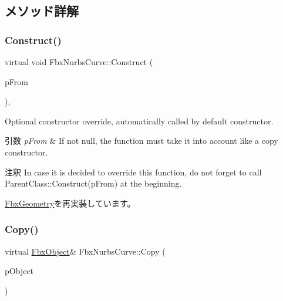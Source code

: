 \subsection{メソッド詳解}
\mbox{\label{class_fbx_nurbs_curve_ac730e9ec1d56724f8495725b0491ddd8}} 
\subsubsection{\texorpdfstring{Construct()}{Construct()}}
{\footnotesize\ttfamily virtual void Fbx\+Nurbs\+Curve\+::\+Construct (\begin{DoxyParamCaption}\item[{const \hyperlink{class_fbx_object}{Fbx\+Object} $\ast$}]{p\+From }\end{DoxyParamCaption})\hspace{0.3cm}{\ttfamily [protected]}, {\ttfamily [virtual]}}

Optional constructor override, automatically called by default constructor. 
\begin{DoxyParams}{引数}
{\em p\+From} & If not null, the function must take it into account like a copy constructor. \\
\hline
\end{DoxyParams}
\begin{DoxyRemark}{注釈}
In case it is decided to override this function, do not forget to call Parent\+Class\+::\+Construct(p\+From) at the beginning. 
\end{DoxyRemark}


\hyperlink{class_fbx_geometry_a26ca96a86f17783c45ff83b33d2b5324}{Fbx\+Geometry}を再実装しています。

\mbox{\label{class_fbx_nurbs_curve_ad48046242c0a63d929b5440563668f79}} 
\subsubsection{\texorpdfstring{Copy()}{Copy()}}
{\footnotesize\ttfamily virtual \hyperlink{class_fbx_object}{Fbx\+Object}\& Fbx\+Nurbs\+Curve\+::\+Copy (\begin{DoxyParamCaption}\item[{const \hyperlink{class_fbx_object}{Fbx\+Object} \&}]{p\+Object }\end{DoxyParamCaption})\hspace{0.3cm}{\ttfamily [virtual]}}

